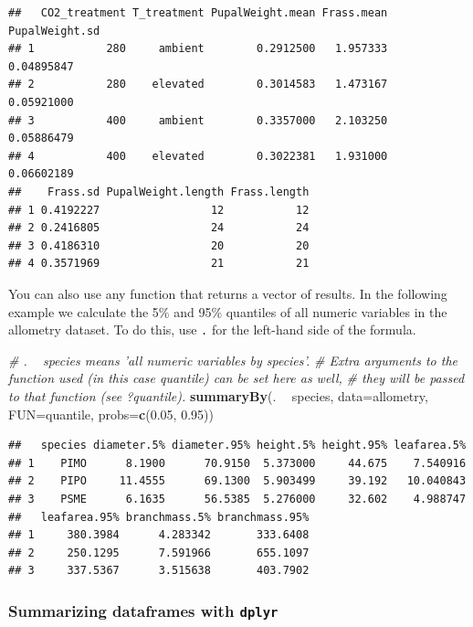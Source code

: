 \documentclass[]{book}
\newenvironment{Shaded}{\begin{snugshade}}{\end{snugshade}}
\newcommand{\CommentTok}[1]{\textcolor[rgb]{0.56,0.35,0.01}{\textit{#1}}}
\newcommand{\DataTypeTok}[1]{\textcolor[rgb]{0.13,0.29,0.53}{#1}}
\newcommand{\FloatTok}[1]{\textcolor[rgb]{0.00,0.00,0.81}{#1}}
\newcommand{\KeywordTok}[1]{\textcolor[rgb]{0.13,0.29,0.53}{\textbf{#1}}}
\newcommand{\NormalTok}[1]{#1}
\newcommand{\OperatorTok}[1]{\textcolor[rgb]{0.81,0.36,0.00}{\textbf{#1}}}
\newcommand{\StringTok}[1]{\textcolor[rgb]{0.31,0.60,0.02}{#1}}
\begin{document}
\begin{verbatim}
##   CO2_treatment T_treatment PupalWeight.mean Frass.mean PupalWeight.sd
## 1           280     ambient        0.2912500   1.957333     0.04895847
## 2           280    elevated        0.3014583   1.473167     0.05921000
## 3           400     ambient        0.3357000   2.103250     0.05886479
## 4           400    elevated        0.3022381   1.931000     0.06602189
##    Frass.sd PupalWeight.length Frass.length
## 1 0.4192227                 12           12
## 2 0.2416805                 24           24
## 3 0.4186310                 20           20
## 4 0.3571969                 21           21
\end{verbatim}

You can also use any function that returns a vector of results. In the following example we calculate the 5\% and 95\% quantiles of all numeric variables in the allometry dataset. To do this, use \texttt{.} for the left-hand side of the formula.

\begin{Shaded}
\begin{Highlighting}[]
\CommentTok{# . ~ species means 'all numeric variables by species'.}
\CommentTok{# Extra arguments to the function used (in this case quantile) can be set here as well,}
\CommentTok{# they will be passed to that function (see ?quantile).}
\KeywordTok{summaryBy}\NormalTok{(. }\OperatorTok{~}\StringTok{ }\NormalTok{species, }\DataTypeTok{data=}\NormalTok{allometry, }\DataTypeTok{FUN=}\NormalTok{quantile, }\DataTypeTok{probs=}\KeywordTok{c}\NormalTok{(}\FloatTok{0.05}\NormalTok{, }\FloatTok{0.95}\NormalTok{))}
\end{Highlighting}
\end{Shaded}

\begin{verbatim}
##   species diameter.5% diameter.95% height.5% height.95% leafarea.5%
## 1    PIMO      8.1900      70.9150  5.373000     44.675    7.540916
## 2    PIPO     11.4555      69.1300  5.903499     39.192   10.040843
## 3    PSME      6.1635      56.5385  5.276000     32.602    4.988747
##   leafarea.95% branchmass.5% branchmass.95%
## 1     380.3984      4.283342       333.6408
## 2     250.1295      7.591966       655.1097
## 3     337.5367      3.515638       403.7902
\end{verbatim}

\hypertarget{dplyr}{%
\subsubsection{\texorpdfstring{Summarizing dataframes with \texttt{dplyr}}{Summarizing dataframes with dplyr}}\label{dplyr}}
\end{document}
